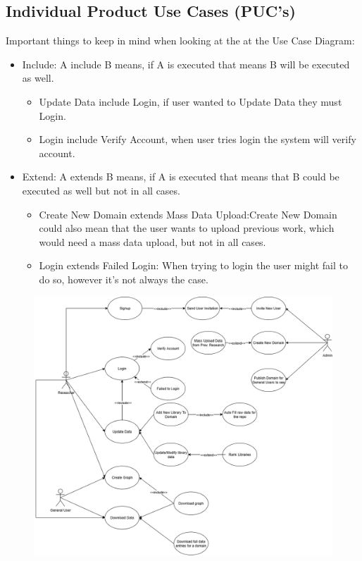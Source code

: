\documentclass[12pt]{article}
\begin{document}
\subsection{Individual Product Use Cases (PUC's)}
Important things to keep in mind when looking at the at the Use Case Diagram:
\begin{itemize}
  \item Include: A  include B means, if A is executed that means B will be executed as well. 
  \begin{itemize}
    \item Update Data include Login, if user wanted to Update Data they must Login.
    \item Login include Verify Account, when user tries login the system will verify account.
  \end{itemize}
  \item Extend: A extends B means, if A is executed that means that B could be executed as well but not in all cases.
  \begin{itemize}
    \item Create New Domain extends Mass Data Upload:Create New Domain could also mean that the user wants to upload previous work, which would need a mass data upload, but not in all cases.
    \item Login extends Failed Login: When trying to login the user might fail to do so, however it's not always the case.
  \end{itemize}
\end{itemize}
\begin{figure}[H]
    \centering
    \includegraphics[scale=0.45] {images/usecase.png}
\end{figure}
\end{document}
